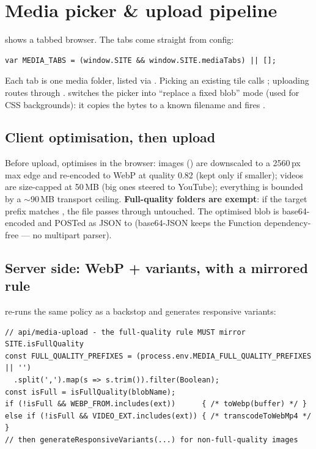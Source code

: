 \documentclass[11pt]{article}
\begin{document}
\section{Media picker \& upload pipeline}

 shows a tabbed browser. The tabs
come straight from config:

\begin{lstlisting}
var MEDIA_TABS = (window.SITE && window.SITE.mediaTabs) || [];
\end{lstlisting}

Each tab is one media folder, listed via . Picking an
existing tile calls ; uploading routes through .
 switches the picker into ``replace a fixed blob'' mode
(used for CSS backgrounds): it copies the bytes to a known filename and fires
.

\subsection{Client optimisation, then upload}

Before upload,  optimises in the browser: images
() are downscaled to a 2560\,px max edge and re-encoded to WebP
at quality 0.82 (kept only if smaller); videos are size-capped at 50\,MB (big ones
steered to YouTube); everything is bounded by a $\sim$90\,MB transport ceiling.
\textbf{Full-quality folders are exempt}: if the target prefix matches
, the file passes through untouched. The optimised
blob is base64-encoded and POSTed as JSON to  (base64-JSON
keeps the Function dependency-free --- no multipart parser).

\subsection{Server side: WebP + variants, with a mirrored rule}

 re-runs the same policy as a backstop and generates
responsive variants:

\begin{lstlisting}
// api/media-upload - the full-quality rule MUST mirror SITE.isFullQuality
const FULL_QUALITY_PREFIXES = (process.env.MEDIA_FULL_QUALITY_PREFIXES || '')
  .split(',').map(s => s.trim()).filter(Boolean);
const isFull = isFullQuality(blobName);
if (!isFull && WEBP_FROM.includes(ext))      { /* toWebp(buffer) */ }
else if (!isFull && VIDEO_EXT.includes(ext)) { /* transcodeToWebMp4 */ }
// then generateResponsiveVariants(...) for non-full-quality images
\end{lstlisting}
\end{document}
